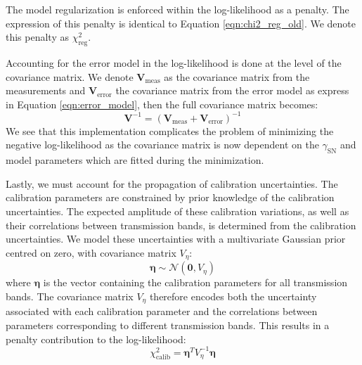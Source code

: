 
The model regularization is enforced within the log-likelihood as a penalty. The expression of this penalty is identical to Equation \ref{eqn:chi2_reg_old}. 
We denote this penalty as $\chi^2_{\text{reg}}$. 

Accounting for the error model in the log-likelihood is done at the level of the covariance matrix. We denote $\mathbf{V}_{\text{meas}}$ as the covariance matrix from the measurements 
and $\mathbf{V}_{\text{error}}$ the covariance matrix from the error model as express in Equation \ref{eqn:error_model}, then the full covariance matrix becomes:
\begin{equation}
    \mathbf{V}^{-1} = \left( \mathbf{V}_{\text{meas}} + \mathbf{V}_{\text{error}} \right)^{-1}
\end{equation}
We see that this implementation complicates the problem of minimizing the negative log-likelihood as the covariance matrix is now dependent on the $\gamma_{\text{SN}}$ and model parameters which are 
fitted during the minimization. 

Lastly, we must account for the propagation of calibration uncertainties. 
The calibration parameters are constrained by prior knowledge of the calibration uncertainties. 
The expected amplitude of these calibration variations, as well as their correlations between transmission bands, 
is determined from the calibration uncertainties. We model these uncertainties with a multivariate Gaussian prior centred on zero, 
with covariance matrix $V_\eta$:
\begin{equation}
\boldsymbol{\eta} \sim \mathcal{N}(\mathbf{0},V_\eta)
\end{equation}
where $\boldsymbol{\eta}$ is the vector containing the calibration parameters for all transmission bands. 
The covariance matrix $V_\eta$ therefore encodes both the uncertainty associated with each calibration parameter and the correlations between 
parameters corresponding to different transmission bands. This results in a penalty contribution to the log-likelihood: 
\begin{equation}
\chi^2_{\text{calib}} =
\boldsymbol{\eta}^{T}V_\eta^{-1}\boldsymbol{\eta}
\end{equation}

